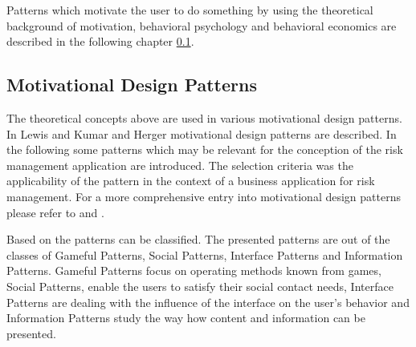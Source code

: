 Patterns which motivate the user to do something by using the theoretical background of motivation, behavioral psychology and behavioral economics are described in the following chapter \ref{sec:theoryBc}.


\newpage

\subsection{Motivational Design Patterns}
\label{sec:theoryBc}

The theoretical concepts above are used in various motivational design patterns. In Lewis \cite{lewisIrresistibleAppsMotivational2014} and Kumar and Herger \cite{kumarGamificationWorkDesigning2013} motivational design patterns are described. In the following some patterns which may be relevant for the conception of the risk management application are introduced. The selection criteria was the applicability of the pattern in the context of a business application for risk management. For a more comprehensive entry into motivational design patterns please refer to \cite{lewisIrresistibleAppsMotivational2014} and \cite{kumarGamificationWorkDesigning2013}.

Based on \cite{lewisIrresistibleAppsMotivational2014} the patterns can be classified. The presented patterns are out of the classes of Gameful Patterns, Social Patterns, Interface Patterns and Information Patterns. Gameful Patterns focus on operating methods known from games, Social Patterns, enable the users to satisfy their social contact needs, Interface Patterns are dealing with the influence of the interface on the user's behavior and Information Patterns study the way how content and information can be presented. \cite[p. 4, 5, 6]{lewisIrresistibleAppsMotivational2014}


